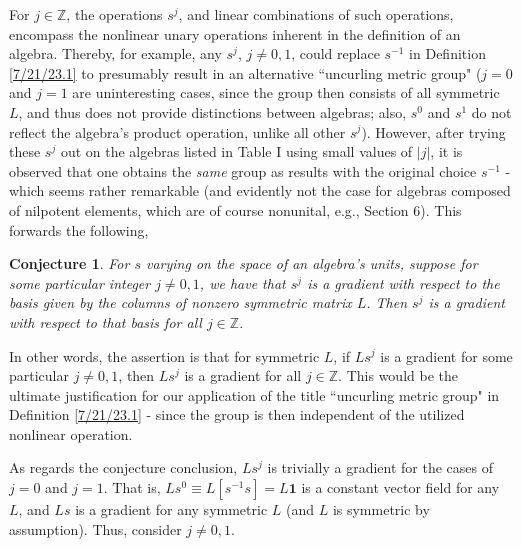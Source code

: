 \documentclass{amsart}
\numberwithin{equation}{section}
\newtheorem*{conjecture}{Conjecture}
\theoremstyle{definition}
\numberwithin{theorem}{section}
\begin{document}
For $j\in \mathbb{Z}$, the operations $s^j$, and linear combinations of such operations, encompass the nonlinear unary operations inherent in the definition of an algebra.  Thereby, for example, any $s^j$, $j\ne 0,1$,  could replace $s^{-1}$ in Definition \ref{7/21/23.1} to presumably result in an alternative ``uncurling metric group" ($j=0$ and $j=1$ are uninteresting cases, since the group then consists of all symmetric $L$, and thus does not provide distinctions between algebras; also, $s^0$ and $s^1$ do not reflect the algebra's product operation, unlike all other $s^j$).  However, after trying these $s^j$ out on the algebras listed in Table I using small values of $|j|$, it is observed that one obtains the {\it same} group as results with the original choice $s^{-1}$ - which seems rather remarkable (and evidently not the case for algebras composed of nilpotent elements, which are of course nonunital, e.g., Section 6).  This forwards the following,

  \begin{conjecture}\label{8/16/23.1}
   For $s$ varying on the space of an algebra's units, suppose for some particular integer $j\ne 0,1$, we have that $s^j$ is a gradient with respect to the basis given by the columns of nonzero symmetric matrix $L$.  Then $s^j$ is a gradient with respect to that basis for all $j\in \mathbb{Z}$. 
   \end{conjecture}
  
In other words, the assertion is that for symmetric $L$, if $Ls^j$ is a gradient for some particular $j\ne 0,1$, then $Ls^j$ is a gradient for all $j\in \mathbb{Z}$.  This would be the ultimate justification for our application of the title ``uncurling metric group" in Definition \ref{7/21/23.1} - since the group is then independent of the utilized nonlinear operation.

 As regards the conjecture conclusion, $Ls^j$ is trivially a gradient for the cases of $j=0$ and $j=1$.  That is, $Ls^0 \equiv L[s^{-1}s] = L\mathbf{1}$ is a constant vector field for any $L$, and $Ls$ is a gradient for any symmetric $L$ (and $L$ is symmetric by assumption).  Thus, consider $j\ne 0,1$. 
 
\end{document}
